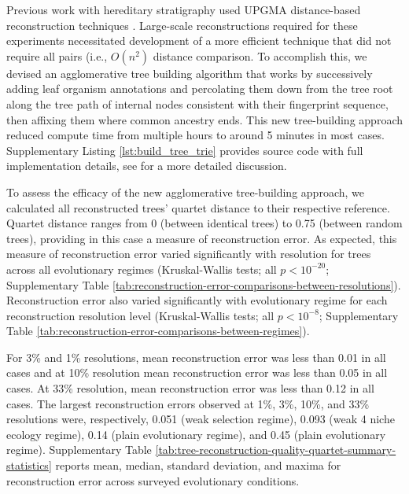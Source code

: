 Previous work with hereditary stratigraphy used UPGMA distance-based reconstruction techniques \citep{moreno2022hereditary}.
Large-scale reconstructions required for these experiments necessitated development of a more efficient technique that did not require all pairs (i.e., $O(n^2)$ distance comparison.
To accomplish this, we devised an agglomerative tree building algorithm that works by successively adding leaf organism annotations and percolating them down from the tree root along the tree path of internal nodes consistent with their fingerprint sequence, then affixing them where common ancestry ends.
This new tree-building approach reduced compute time from multiple hours to around 5 minutes in most cases.
Supplementary Listing \ref{lst:build_tree_trie} provides source code with full implementation details, see \citep{moreno2024analysis} for a more detailed discussion.



To assess the efficacy of the new agglomerative tree-building approach, we calculated all reconstructed trees' quartet distance to their respective reference.
Quartet distance ranges from 0 (between identical trees) to 0.75 (between random trees), providing in this case a measure of reconstruction error.
As expected, this measure of reconstruction error varied significantly with resolution for trees across all evolutionary regimes (Kruskal-Wallis tests; all $p < 10^{-20}$; Supplementary Table \ref{tab:reconstruction-error-comparisons-between-resolutions}).
Reconstruction error also varied significantly with evolutionary regime for each reconstruction resolution level (Kruskal-Wallis tests; all $p < 10^{-8}$; Supplementary Table \ref{tab:reconstruction-error-comparisons-between-regimes}).

For 3\% and 1\% resolutions, mean reconstruction error was less than 0.01 in all cases and at 10\% resolution mean reconstruction error was less than 0.05 in all cases.
At 33\% resolution, mean reconstruction error was less than 0.12 in all cases.
The largest reconstruction errors observed at 1\%, 3\%, 10\%, and 33\% resolutions were, respectively, 0.051 (weak selection regime), 0.093 (weak 4 niche ecology regime), 0.14 (plain evolutionary regime), and 0.45 (plain evolutionary regime).
Supplementary Table \ref{tab:tree-reconstruction-quality-quartet-summary-statistics} reports mean, median, standard deviation, and maxima for reconstruction error across surveyed evolutionary conditions.

